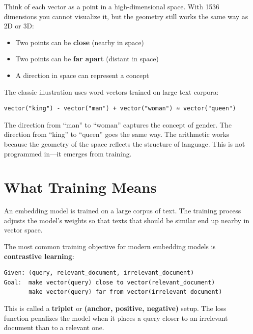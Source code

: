 Think of each vector as a point in a high-dimensional space. With 1536 dimensions you cannot
visualize it, but the geometry still works the same way as 2D or 3D:

\begin{itemize}
    \item Two points can be \textbf{close} (nearby in space)
    \item Two points can be \textbf{far apart} (distant in space)
    \item A direction in space can represent a concept
\end{itemize}

The classic illustration uses word vectors trained on large text corpora:

\begin{Verbatim}
vector("king") - vector("man") + vector("woman") ≈ vector("queen")
\end{Verbatim}

The direction from ``man'' to ``woman'' captures the concept of gender. The direction from
``king'' to ``queen'' goes the same way. The arithmetic works because the geometry of the
space reflects the structure of language. This is not programmed in---it emerges from training.

\section{What Training Means}

An embedding model is trained on a large corpus of text. The training process adjusts the
model's weights so that texts that should be similar end up nearby in vector space.

The most common training objective for modern embedding models is \textbf{contrastive
learning}:

\begin{Verbatim}
Given: (query, relevant_document, irrelevant_document)
Goal:  make vector(query) close to vector(relevant_document)
       make vector(query) far from vector(irrelevant_document)
\end{Verbatim}

This is called a \textbf{triplet} or \textbf{(anchor, positive, negative)} setup. The loss
function penalizes the model when it places a query closer to an irrelevant document than to
a relevant one.

